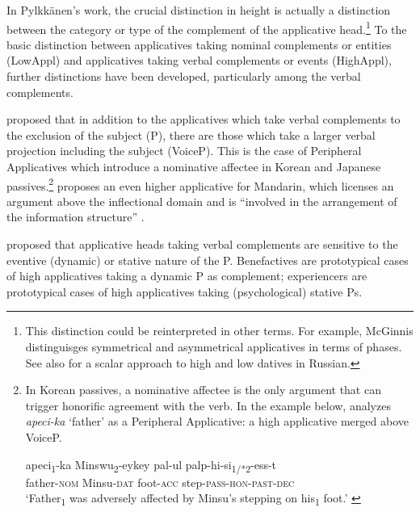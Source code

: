 \documentclass[output=paper,colorlinks,citecolor=brown,nonflat]{./langscibook}
\begin{document}
In Pylkkänen’s work, the crucial distinction in height is actually a distinction between the category or type of the complement of the applicative head.\footnote{This distinction could be reinterpreted in other terms. For example, McGinnis distinguisges symmetrical and asymmetrical applicatives in terms of phases. See also \citet{BonehNash2017} for a scalar approach to high and low datives in Russian.} To the basic distinction between applicatives taking nominal complements or entities (LowAppl) and applicatives taking verbal complements or events (HighAppl), further distinctions have been developed, particularly among the verbal complements. 

\citet{Kim2011high} proposed that in addition to the applicatives which take verbal complements to the exclusion of the subject (\liv P), there are those which take a larger verbal projection including the subject (VoiceP). This is the case of Peripheral Applicatives which introduce a nominative affectee in Korean and Japanese passives.\footnote{In Korean passives, a nominative affectee is the only argument that can trigger honorific agreement with the verb. In the example below, \citet{Kim2012affectees} analyzes \textit{apeci-ka} ‘father’ as a Peripheral Applicative: a high applicative merged above VoiceP.

\ea%
    \gll apeci\textsubscript{1}-ka Minswu\textsubscript{2}-eykey pal-ul palp-hi-si\textsubscript{1/*2}-ess-t\\
    father\textsc{-nom}  Minsu\textsc{-dat} foot\textsc{-acc}   step\textsc{-pass-hon-past-dec}\\
    \glt ‘Father\textsubscript{1} was adversely affected by Minsu’s stepping on his\textsubscript{1} foot.’  \citep{Kim2012affectees}
    \z
} \citet{Tsai2018} proposes an even higher applicative for Mandarin, which licenses an argument above the inflectional domain and is “involved in the arrangement of the information structure” \citep[18]{Tsai2018}. 


\citet{Cuervo2003; Cuervo2011; Cuervo2015Chapter} proposed that applicative heads taking verbal complements are sensitive to the eventive (dynamic) or stative nature of the \liv P. Benefactives are prototypical cases of high applicatives taking a dynamic \liv P as complement; experiencers are prototypical cases of high applicatives taking (psychological) stative \liv Ps. 
\end{document}
